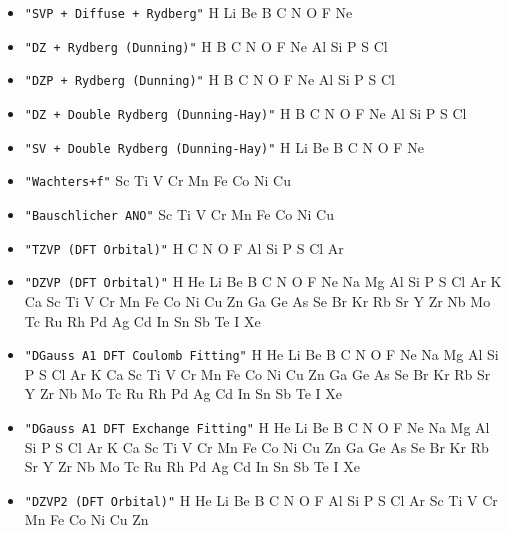 \begin{itemize}
\item \verb#"SVP + Diffuse + Rydberg"# \newline
 H Li Be B C N O F Ne

\item \verb#"DZ + Rydberg (Dunning)"# \newline
 H B C N O F Ne Al Si P S Cl

\item \verb#"DZP + Rydberg (Dunning)"# \newline
 H B C N O F Ne Al Si P S Cl

\item \verb#"DZ + Double Rydberg (Dunning-Hay)"# \newline
 H B C N O F Ne Al Si P S Cl

\item \verb#"SV + Double Rydberg (Dunning-Hay)"# \newline
 H Li Be B C N O F Ne

\item \verb#"Wachters+f"# \newline
 Sc Ti V Cr Mn Fe Co Ni Cu

\item \verb#"Bauschlicher ANO"# \newline
 Sc Ti V Cr Mn Fe Co Ni Cu

\item \verb#"TZVP (DFT Orbital)"# \newline
 H C N O F Al Si P S Cl Ar

\item \verb#"DZVP (DFT Orbital)"# \newline
 H He Li Be B C N O F Ne Na Mg Al Si P S Cl Ar K Ca Sc Ti V Cr Mn Fe Co
 Ni Cu Zn Ga Ge As Se Br Kr Rb Sr Y Zr Nb Mo Tc Ru Rh Pd Ag Cd In Sn Sb
 Te I Xe

\item \verb#"DGauss A1 DFT Coulomb Fitting"# \newline
 H He Li Be B C N O F Ne Na Mg Al Si P S Cl Ar K Ca Sc Ti V Cr Mn Fe Co
 Ni Cu Zn Ga Ge As Se Br Kr Rb Sr Y Zr Nb Mo Tc Ru Rh Pd Ag Cd In Sn Sb
 Te I Xe

\item \verb#"DGauss A1 DFT Exchange Fitting"# \newline
 H He Li Be B C N O F Ne Na Mg Al Si P S Cl Ar K Ca Sc Ti V Cr Mn Fe Co
 Ni Cu Zn Ga Ge As Se Br Kr Rb Sr Y Zr Nb Mo Tc Ru Rh Pd Ag Cd In Sn Sb
 Te I Xe

\item \verb#"DZVP2 (DFT Orbital)"# \newline
 H He Li Be B C N O F Al Si P S Cl Ar Sc Ti V Cr Mn Fe Co Ni Cu Zn


\end{itemize}
